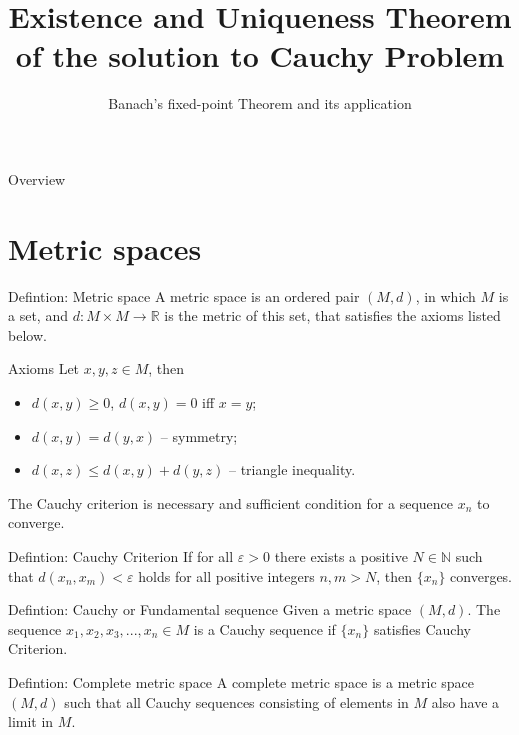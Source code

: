 \documentclass[10pt]{beamer}
\title[Existence and Uniqueness Theorem of the solution to Cauchy Problem]
{Existence and Uniqueness Theorem of the solution to Cauchy Problem}
\subtitle
{Banach's fixed-point Theorem and its application}
\begin{document}
\begin{frame}
  \titlepage
\end{frame}

\begin{frame}{Overview}
  \tableofcontents
\end{frame}

\section{Metric spaces}
\begin{frame}
  \begin{block}{Defintion: Metric space}
    A metric space is an ordered pair \((M, d)\), in which \(M\) is a set,
    and \(d:M \times M \rightarrow \mathbb{R}\) is the metric of this set, that satisfies
    the axioms listed below.
  \end{block}

  \begin{alertblock}{Axioms}
    Let \(x, y, z \in M\), then
    \begin{itemize}
      \item \(d(x, y) \ge 0\), \(d(x, y) = 0\) iff \(x = y\);
      \item \(d(x, y) = d(y, x)\) -- symmetry;
      \item \(d(x, z) \le d(x, y) + d(y, z)\) -- triangle inequality.
    \end{itemize}
  \end{alertblock}
\end{frame}

\begin{frame}
  The Cauchy criterion is necessary and sufficient condition for a sequence \(x_n\) to converge.
  \begin{block}{Defintion: Cauchy Criterion}
    If for all \(\varepsilon > 0\) there exists a positive \(N \in \mathbb{N}\) such that
    \(d(x_n, x_m) < \varepsilon\) holds for all positive integers \(n, m > N\), then \(\{x_n\}\) converges.
  \end{block}

  \begin{block}{Defintion: Cauchy or Fundamental sequence}
    Given a metric space \((M, d)\). The sequence \(x_1, x_2, x_3, ..., x_n \in M\) is a Cauchy sequence if
    \(\{x_n\}\) satisfies Cauchy Criterion.
  \end{block}

  \begin{block}{Defintion: Complete metric space}
    A complete metric space is a metric space \((M, d)\) such that
    all Cauchy sequences consisting of elements in \(M\) also have a limit in \(M\).
  \end{block}
\end{frame}
\end{document}
